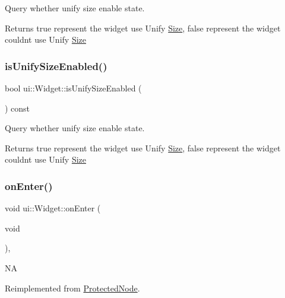Query whether unify size enable state. \begin{DoxyReturn}{Returns}
true represent the widget use Unify \hyperlink{classSize}{Size}, false represent the widget couldn\textquotesingle{}t use Unify \hyperlink{classSize}{Size} 
\end{DoxyReturn}
\mbox{\label{classui_1_1Widget_ad4e0c8796f018f4a1a97e9ca860d6f43}} 
\subsubsection{\texorpdfstring{is\+Unify\+Size\+Enabled()}{isUnifySizeEnabled()}\hspace{0.1cm}{\footnotesize\ttfamily [2/2]}}
{\footnotesize\ttfamily bool ui\+::\+Widget\+::is\+Unify\+Size\+Enabled (\begin{DoxyParamCaption}{ }\end{DoxyParamCaption}) const}

Query whether unify size enable state. \begin{DoxyReturn}{Returns}
true represent the widget use Unify \hyperlink{classSize}{Size}, false represent the widget couldn\textquotesingle{}t use Unify \hyperlink{classSize}{Size} 
\end{DoxyReturn}
\mbox{\label{classui_1_1Widget_a9cda9b9ffbf77a8ed695e6b97b9a46cc}} 
\subsubsection{\texorpdfstring{on\+Enter()}{onEnter()}\hspace{0.1cm}{\footnotesize\ttfamily [1/2]}}
{\footnotesize\ttfamily void ui\+::\+Widget\+::on\+Enter (\begin{DoxyParamCaption}\item[{void}]{ }\end{DoxyParamCaption})\hspace{0.3cm}{\ttfamily [override]}, {\ttfamily [virtual]}}

NA 

Reimplemented from \hyperlink{classProtectedNode_ade991090bee4173b4e1f47382adc99b9}{Protected\+Node}.



